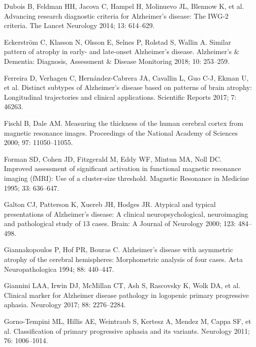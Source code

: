 \documentclass[]{article}
\begin{document}
\hypertarget{ref-dubois_advancing_2014}{}
Dubois B, Feldman HH, Jacova C, Hampel H, Molinuevo JL, Blennow K, et
al. Advancing research diagnostic criteria for Alzheimer's disease: The
IWG-2 criteria. The Lancet Neurology 2014; 13: 614--629.

\hypertarget{ref-eckerstrom_similar_2018}{}
Eckerström C, Klasson N, Olsson E, Selnes P, Rolstad S, Wallin A.
Similar pattern of atrophy in early- and late-onset Alzheimer's disease.
Alzheimer's \& Dementia: Diagnosis, Assessment \& Disease Monitoring
2018; 10: 253--259.

\hypertarget{ref-ferreira_distinct_2017}{}
Ferreira D, Verhagen C, Hernández-Cabrera JA, Cavallin L, Guo C-J, Ekman
U, et al. Distinct subtypes of Alzheimer's disease based on patterns of
brain atrophy: Longitudinal trajectories and clinical applications.
Scientific Reports 2017; 7: 46263.

\hypertarget{ref-fischl_measuring_2000}{}
Fischl B, Dale AM. Measuring the thickness of the human cerebral cortex
from magnetic resonance images. Proceedings of the National Academy of
Sciences 2000; 97: 11050--11055.

\hypertarget{ref-forman_improved_1995}{}
Forman SD, Cohen JD, Fitzgerald M, Eddy WF, Mintun MA, Noll DC. Improved
assessment of significant activation in functional magnetic resonance
imaging (fMRI): Use of a cluster-size threshold. Magnetic Resonance in
Medicine 1995; 33: 636--647.

\hypertarget{ref-galton_atypical_2000}{}
Galton CJ, Patterson K, Xuereb JH, Hodges JR. Atypical and typical
presentations of Alzheimer's disease: A clinical neuropsychological,
neuroimaging and pathological study of 13 cases. Brain: A Journal of
Neurology 2000; 123: 484--498.

\hypertarget{ref-giannakopoulos_alzheimers_1994}{}
Giannakopoulos P, Hof PR, Bouras C. Alzheimer's disease with asymmetric
atrophy of the cerebral hemispheres: Morphometric analysis of four
cases. Acta Neuropathologica 1994; 88: 440--447.

\hypertarget{ref-giannini_clinical_2017}{}
Giannini LAA, Irwin DJ, McMillan CT, Ash S, Rascovsky K, Wolk DA, et al.
Clinical marker for Alzheimer disease pathology in logopenic primary
progressive aphasia. Neurology 2017; 88: 2276--2284.

\hypertarget{ref-gorno-tempini_classification_2011}{}
Gorno-Tempini ML, Hillis AE, Weintraub S, Kertesz A, Mendez M, Cappa SF,
et al. Classification of primary progressive aphasia and its variants.
Neurology 2011; 76: 1006--1014.
\end{document}
